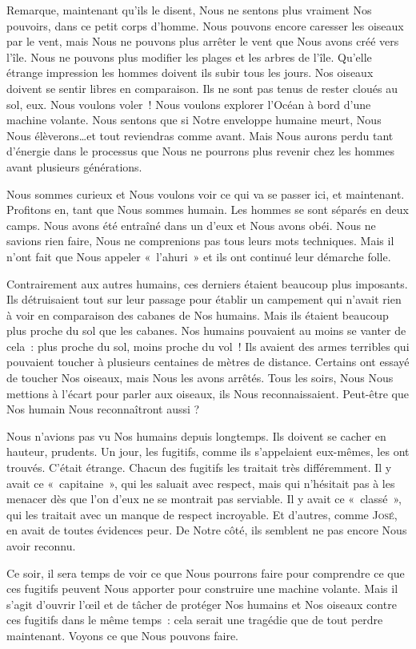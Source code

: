 {        Remarque, maintenant qu’ils le disent, Nous ne sentons plus vraiment Nos pouvoirs, dans ce petit corps d’homme.
        Nous pouvons encore caresser les oiseaux par le vent, mais Nous ne pouvons plus arrêter le vent que Nous avons créé vers l’île.
        Nous ne pouvons plus modifier les plages et les arbres de l’île.
        Qu’elle étrange impression les hommes doivent ils subir tous les jours.
        Nos oiseaux doivent se sentir libres en comparaison.  Ils ne sont pas tenus de rester cloués au sol, eux.
        Nous voulons voler~!  Nous voulons explorer l’Océan à bord d’une machine volante.
        Nous sentons que si Notre enveloppe humaine meurt, Nous Nous élèverons\ldots et tout reviendras comme avant.
        Mais Nous aurons perdu tant d’énergie dans le processus que Nous ne pourrons plus revenir chez les hommes avant plusieurs générations.

        Nous sommes curieux et Nous voulons voir ce qui va se passer ici, et maintenant.  Profitons en, tant que Nous sommes humain.
        Les hommes se sont séparés en deux camps.  Nous avons été entraîné dans un d’eux et Nous avons obéi.
        Nous ne savions rien faire, Nous ne comprenions pas tous leurs mots techniques.
        Mais il n’ont fait que Nous appeler «~l’ahuri~» et ils ont continué leur démarche folle.

        Contrairement aux autres humains, ces derniers étaient beaucoup plus imposants.
        Ils détruisaient tout sur leur passage pour établir un campement qui n’avait rien à voir en comparaison des cabanes de Nos humains.
        Mais ils étaient beaucoup plus proche du sol que les cabanes.  Nos humains pouvaient au moins se vanter de cela~:  plus proche du sol, moins proche du vol~!
        Ils avaient des armes terribles qui pouvaient toucher à plusieurs centaines de mètres de distance.
        Certains ont essayé de toucher Nos oiseaux, mais Nous les avons arrêtés.
        Tous les soirs, Nous Nous mettions à l’écart pour parler aux oiseaux, ils Nous reconnaissaient.  Peut-être que Nos humain Nous reconnaîtront aussi ?

        Nous n’avions pas vu Nos humains depuis longtemps.  Ils doivent se cacher en hauteur, prudents.
        Un jour, les fugitifs, comme ils s’appelaient eux-mêmes, les ont trouvés.  C’était étrange.
        Chacun des fugitifs les traitait très différemment.
        Il y avait ce «~capitaine~», qui les saluait avec respect, mais qui n’hésitait pas à les menacer dès que l’on d’eux ne se montrait pas serviable.
        Il y avait ce «~classé~», qui les traitait avec un manque de respect incroyable.
        Et d’autres, comme \textsc{José}, en avait de toutes évidences peur.
        De Notre côté, ils semblent ne pas encore Nous avoir reconnu.

        Ce soir, il sera temps de voir ce que Nous pourrons faire pour comprendre ce que ces fugitifs peuvent Nous apporter pour construire une machine volante.
        Mais il s’agit d’ouvrir l’œil et de tâcher de protéger Nos humains et Nos oiseaux contre ces fugitifs dans le même temps~:  cela serait une tragédie que de tout perdre maintenant.
        Voyons ce que Nous pouvons faire.
}

